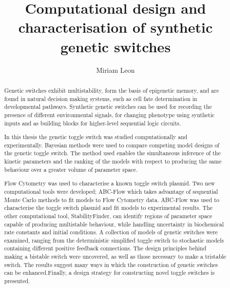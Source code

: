 \documentclass[]{phdthesis}
\title{Computational design and\\[0.2em]characterisation of synthetic\\[0.2em] genetic switches}
\author{Miriam Leon}
\begin{document}
\maketitle


\begin{abstract}
Genetic switches exhibit multistability, form the basis of epigenetic memory, and are found in natural decision making systems, such as cell fate determination in developmental pathways. Synthetic genetic switches can be used for recording the presence of different environmental signals, for changing phenotype using synthetic inputs and as building blocks for higher-level sequential logic circuits. 

In this thesis the genetic toggle switch was studied computationally and experimentally. Bayesian methods were used to compare competing model designs of the genetic toggle switch. The method used enables the simultaneous inference of the kinetic parameters and the ranking of the models with respect to producing the same behaviour over a greater volume of parameter space.

Flow Cytometry was used to characterise a known toggle switch plasmid. Two new computational tools were developed; ABC-Flow which takes advantage of sequential Monte Carlo methods to fit models to Flow Cytometry data. ABC-Flow was used to characterise the toggle switch plasmid and fit models to experimental results. The other computational tool, StabilityFinder, can identify regions of parameter space capable of producing multistable behaviour, while handling uncertainty in biochemical rate constants and initial conditions. A collection of models of genetic switches were examined, ranging from the deterministic simplified toggle switch to stochastic models containing different positive feedback connections. The design principles behind making a bistable switch were uncovered, as well as those necessary to make a tristable switch. The results suggest many ways in which the construction of genetic switches can be enhanced.Finally, a design strategy for constructing novel toggle switches is presented.\end{abstract}

\tableofcontents*
\listoffigures
\listoftables
{}

\printglossary[type=\acronymtype, title=Abbreviations, toctitle=List of abbreviations]

\end{document}
